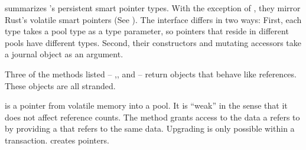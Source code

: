  summarizes \this{}'s persistent smart pointer types.  With
the exception of , they mirror Rust's volatile smart pointers (See
).  The interface differs in two ways: First, each type
takes a pool type as a type parameter, so pointers that reside in different
pools have different types.  Second, their constructors and mutating accessors
take a journal object as an argument.

Three of the methods listed --
,\linebreak{}, and
 -- return objects that behave like references.  These
objects are all stranded. %

 is a pointer from volatile memory into a pool.  It is ``weak'' in
the sense that it does not affect reference counts.  The  method
grants access to the data a  refers to by providing a 
that refers to the same data.  Upgrading is only possible within a transaction.
 creates  pointers.

